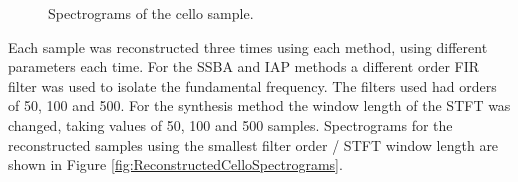 	\begin{figure}[h!]
		\centering
		\quad
		\caption{Spectrograms of the cello sample.}
		\label{fig:CelloSpectrograms}
	\end{figure}

	Each sample was reconstructed three times using each method, using different parameters each time. For the SSBA and
	IAP methods a different order FIR filter was used to isolate the fundamental frequency. The filters used had orders
	of 50, 100 and 500. For the synthesis method the window length of the STFT was changed, taking values of 50, 100 and
	500 samples. Spectrograms for the reconstructed samples using the smallest filter order / STFT window length are
	shown in Figure \ref{fig:ReconstructedCelloSpectrograms}.

